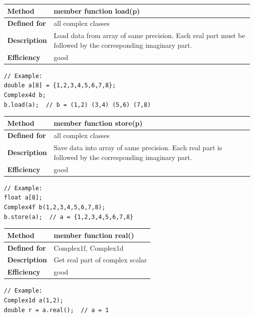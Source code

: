 \documentclass[11pt,a4paper,oneside,openright]{report}
\newcommand{\vspacesmall}{\vspace{3mm}}
\newcommand{\vspacebig}{\vspace{6mm}}
\begin{document}
\begin{tabular}{|p{25mm}|p{100mm}|}
\hline
\bfseries Method & member function load(p) \\ \hline
\bfseries Defined for & all complex classes \\ \hline
\bfseries Description & Load data from array of same precision. 
Each real part must be followed by the corresponding imaginary part. \\ \hline
\bfseries Efficiency & good \\ \hline
\end{tabular}
\vspacesmall

\begin{lstlisting}[frame=none]
// Example:
double a[8] = {1,2,3,4,5,6,7,8};
Complex4d b;
b.load(a);  // b = (1,2) (3,4) (5,6) (7,8)
\end{lstlisting}
\vspacebig


\begin{tabular}{|p{25mm}|p{100mm}|}
\hline
\bfseries Method & member function store(p) \\ \hline
\bfseries Defined for & all complex classes \\ \hline
\bfseries Description & Save data into array of same precision. 
Each real part is followed by the corresponding imaginary part. \\ \hline
\bfseries Efficiency & good \\ \hline
\end{tabular}
\vspacesmall

\begin{lstlisting}[frame=none]
// Example:
float a[8];
Complex4f b(1,2,3,4,5,6,7,8);
b.store(a);  // a = {1,2,3,4,5,6,7,8}
\end{lstlisting}
\vspacebig


\begin{tabular}{|p{25mm}|p{100mm}|}
\hline
\bfseries Method & member function real() \\ \hline
\bfseries Defined for & Complex1f, Complex1d \\ \hline
\bfseries Description & Get real part of complex scalar \\ \hline
\bfseries Efficiency & good \\ \hline
\end{tabular}
\vspacesmall

\begin{lstlisting}[frame=none]
// Example:
Complex1d a(1,2);
double r = a.real();  // a = 1
\end{lstlisting}
\vspacebig
\end{document}
